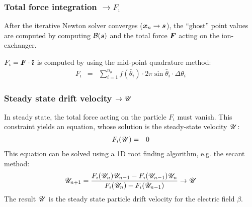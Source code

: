\subsubsection{Total force integration $\rightarrow F_\imath$}
After the iterative Newton solver converges ($\boldsymbol{x}_n \rightarrow \boldsymbol{s}$), 
the ``ghost'' point values are computed by computing $\mathcal{B}(\boldsymbol{s})$ and
the total force $\boldsymbol{F}$ acting on the ion-exchanger.

$F_\imath = \boldsymbol{F} \cdot \boldsymbol{\hat{\imath}}$ is computed by using the mid-point quadrature method:
\begin{eqnarray}
F_\imath &=& \sum_{i=1}^{n_\theta} f(\bar\theta_i) \cdot 
              2 \pi \sin\bar\theta_i \cdot \Delta\theta_i
\end{eqnarray}

\subsubsection{Steady state drift velocity $\rightarrow \mathscr{U}$}
In steady state, the total force acting on the particle $F_\imath$ must vanish.
This constraint yields an equation, whose solution is the steady-state velocity $\mathscr{U}$:
\begin{eqnarray}
F_\imath(\mathscr{U}) &=& 0
\end{eqnarray}
This equation can be solved using a 1D root finding algorithm, e.g. the secant method:
\begin{eqnarray}
\mathscr{U}_{n+1} = \frac{F_\imath(\mathscr{U}_{n})\mathscr{U}_{n-1} - F_\imath(\mathscr{U}_{n-1})\mathscr{U}_{n}}
{F_\imath(\mathscr{U}_{n}) - F_\imath(\mathscr{U}_{n-1})} \rightarrow \mathscr{U}
\end{eqnarray}
The result $\mathscr{U}$ is the 
steady state particle drift velocity for the electric field $\beta$.

